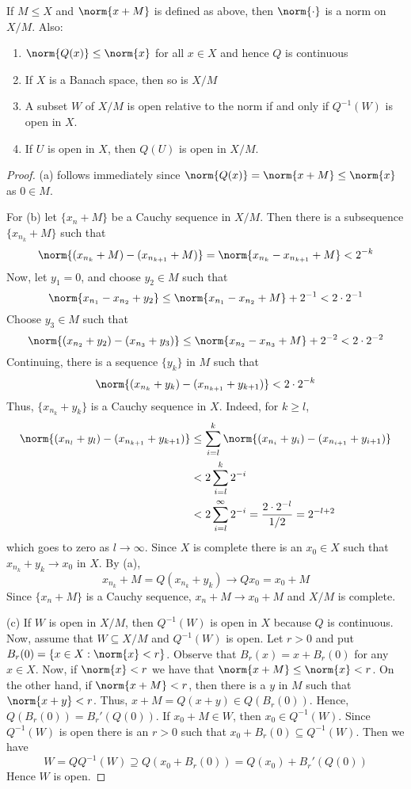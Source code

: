 \begin{thm}
    If $M \leq X$ and $\norm{x+M}$ is defined as above, then $\norm{\cdot}$ is a norm on $X/M$. Also: \begin{enumerate}
        \item[(a)] $\norm{Q(x)}\leq \norm{x}$ for all $x \in X$ and hence $Q$ is continuous
        \item[(b)] If $X$ is a Banach space, then so is $X/M$
        \item[(c)] A subset $W$ of $X/M$ is open relative to the norm if and only if $Q^{-1}(W)$ is open in $X$.
        \item[(d)] If $U$ is open in $X$, then $Q(U)$ is open in $X/M$.
    \end{enumerate}
\end{thm}
\begin{proof}
    (a) follows immediately since $\norm{Q(x)} = \norm{x+M} \leq \norm{x}$ as $0 \in M$.

    For (b) let $\{x_n+M\}$ be a Cauchy sequence in $X/M$. Then there is a subsequence $\{x_{n_k}+M\}$ such that $$\norm{(x_{n_k}+M)-(x_{n_{k+1}}+M)} = \norm{x_{n_k}-x_{n_{k+1}}+M} < 2^{-k}$$
    Now, let $y_1 = 0$, and choose $y_2 \in M$ such that $$\norm{x_{n_1}-x_{n_2}+y_2} \leq \norm{x_{n_1}-x_{n_2}+M} + 2^{-1} < 2\cdot 2^{-1}$$
    Choose $y_3 \in M$ such that $$\norm{(x_{n_2}+y_2)-(x_{n_3}+y_3)} \leq \norm{x_{n_2}-x_{n_3}+M} + 2^{-2} < 2\cdot 2^{-2}$$
    Continuing, there is a sequence $\{y_k\}$ in $M$ such that $$\norm{(x_{n_k}+y_k)-(x_{n_{k+1}}+y_{k+1})} < 2\cdot 2^{-k}$$
    Thus, $\{x_{n_k}+y_k\}$ is a Cauchy sequence in $X$. Indeed, for $k \geq l$, \begin{align*}
        \norm{(x_{n_l}+y_l)-(x_{n_{k+1}}+y_{k+1})} &\leq \sum_{i=l}^k\norm{(x_{n_i}+y_i)-(x_{n_{i+1}}+y_{i+1})} \\
        &< 2\sum_{i=l}^k2^{-i} \\
        &< 2\sum_{i=l}^{\infty}2^{-i} = \frac{2\cdot 2^{-l}}{1/2} = 2^{-l+2}
    \end{align*}
    which goes to zero as $l\rightarrow \infty$. Since $X$ is complete there is an $x_0 \in X$ such that $x_{n_k}+y_k\rightarrow x_0$ in $X$. By (a), $$x_{n_k}+M= Q(x_{n_k}+y_k)\rightarrow Qx_0 = x_0+M$$
    Since $\{x_n+M\}$ is a Cauchy sequence, $x_n+M\rightarrow x_0+M$ and $X/M$ is complete.

    (c) If $W$ is open in $X/M$, then $Q^{-1}(W)$ is open in $X$ because $Q$ is continuous. Now, assume that $W \subseteq X/M$ and $Q^{-1}(W)$ is open. Let $r > 0$ and put $B_r(0) = \{x\in X:\norm{x} < r\}$. Observe that $B_r(x) = x+B_r(0)$ for any $x \in X$. Now, if $\norm{x} < r$ we have that $\norm{x+M} \leq \norm{x} < r$. On the other hand, if $\norm{x+M} < r$, then there is a $y$ in $M$ such that $\norm{x+y} < r$. Thus, $x+M = Q(x+y) \in Q(B_r(0))$. Hence, $Q(B_r(0)) = B_r'(Q(0))$. If $x_0 + M \in W$, then $x_0 \in Q^{-1}(W)$. Since $Q^{-1}(W)$ is open there is an $r > 0$ such that $x_0+B_r(0) \subseteq Q^{-1}(W)$. Then we have $$W = QQ^{-1}(W) \supseteq Q(x_0+B_r(0)) = Q(x_0) + B_r'(Q(0))$$
    Hence $W$ is open.


\end{proof}

